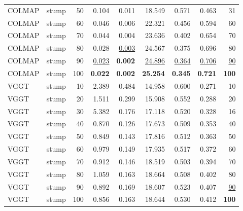 \begin{table}[H]
\begin{tabular}{llrrrrrrr}
COLMAP & stump & 50 & 0.104 & 0.011 & 18.549 & 0.571 & 0.463 & 31 \\
COLMAP & stump & 60 & 0.046 & 0.006 & 22.321 & 0.456 & 0.594 & 60 \\
COLMAP & stump & 70 & 0.044 & 0.004 & 23.636 & 0.402 & 0.654 & 70 \\
COLMAP & stump & 80 & 0.028 & \underline{0.003} & 24.567 & 0.375 & 0.696 & 80 \\
COLMAP & stump & 90 & \underline{0.023} & \textbf{0.002} & \underline{24.896} & \underline{0.364} & \underline{0.706} & \underline{90} \\
COLMAP & stump & 100 & \textbf{0.022} & \textbf{0.002} & \textbf{25.254} & \textbf{0.345} & \textbf{0.721} & \textbf{100} \\
VGGT & stump & 10 & 2.389 & 0.484 & 14.958 & 0.600 & 0.271 & 10 \\
VGGT & stump & 20 & 1.511 & 0.299 & 15.908 & 0.552 & 0.288 & 20 \\
VGGT & stump & 30 & 5.382 & 0.176 & 17.118 & 0.520 & 0.328 & 16 \\
VGGT & stump & 40 & 0.870 & 0.126 & 17.673 & 0.509 & 0.353 & 40 \\
VGGT & stump & 50 & 0.849 & 0.143 & 17.816 & 0.512 & 0.363 & 50 \\
VGGT & stump & 60 & 0.979 & 0.149 & 17.935 & 0.517 & 0.372 & 60 \\
VGGT & stump & 70 & 0.912 & 0.146 & 18.519 & 0.503 & 0.394 & 70 \\
VGGT & stump & 80 & 1.059 & 0.163 & 18.664 & 0.508 & 0.402 & 80 \\
VGGT & stump & 90 & 0.892 & 0.169 & 18.607 & 0.523 & 0.407 & \underline{90} \\
VGGT & stump & 100 & 0.856 & 0.163 & 18.644 & 0.530 & 0.412 & \textbf{100} \\
\bottomrule
\end{tabular}
\end{table}